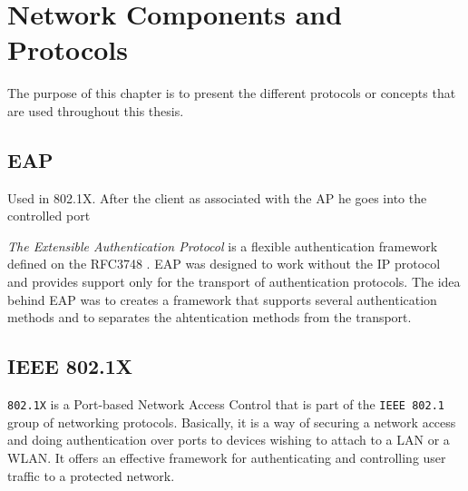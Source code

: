 
\chapter{Network Components and Protocols} %

\label{Chapter3} %


The purpose of this chapter is to present the different protocols or concepts that are used throughout this thesis.

\section{EAP}
Used in 802.1X.
After the client as associated with the AP he goes into the controlled port



\textit{The Extensible Authentication Protocol} is a flexible authentication framework defined on the RFC3748 \cite{rfc3748}. EAP was designed to work without the IP protocol and provides support only for the transport of authentication protocols. The idea behind EAP was to creates a framework that supports several authentication methods and to separates the ahtentication methods from the transport.

\section{IEEE 802.1X}
\texttt{802.1X} is a Port-based Network Access Control that is part of the \texttt{IEEE 802.1} group of networking protocols. Basically, it is a way of securing a network access and doing authentication over ports to devices wishing to attach to a LAN or a WLAN. It offers an effective framework for authenticating and controlling user traffic to a protected network.

